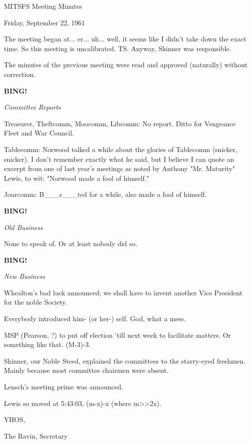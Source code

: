 \documentclass[12pt]{article}
\newcommand{\bing}{{\bf BING!} }
\newcommand{\goto}[1]{\bing \vskip 12pt \centerline{{\em{#1}}}}
\begin{document}
\begin{center}

MITSFS Meeting Minutes

Friday, September 22, 1961

\end{center}
 
\vspace{12pt}

\setlength{\parskip}{6pt}

\noindent
The meeting began at... er... uh... well, it seems like I didn't take down the exact time. So this meeting is uncalibrated. TS. Anyway, Skinner was responsible.

The minutes of the previous meeting were read and approved (naturally) without correction.

\goto{Committee Reports}

Treasurer, Theftcomm, Moocomm, Libcomm: No report. Ditto for Vengeance Fleet and War Council.

Tablecomm: Norwood talked a while about the glories of Tablecomm (snicker, snicker). I don't remember exactly what he said, but I believe I can quote an excerpt from one of last year's meetings as noted by Anthony "Mr. Maturity" Lewis, to wit: "Norwood made a fool of himself."

Jourcomm: B___s___ted for a while, also made a fool of himself.

\goto{Old Business}

None to speak of. Or at least nobody did so.

\goto{New Business}

Whealton's bad luck announced; we shall have to invent another Vice President for the noble Society.

Everybody introduced him- (or her-) self. God, what a mess.

MSP (Pearson, ?) to put off election 'till next week to facilitate matters. Or something like that. (M-3)-3.

Skinner, our Noble Steed, explained the committees to the starry-eyed freshmen. Mainly because most committee chairmen were absent.

Lensch's meeting prime was announced.

Lewis so moved at 5:43:03, (m-x)-x (where m>>2x).

\vspace{12pt}

\centerline{YHOS,}
\centerline{The Ravin, Secretary}
\end{document}

